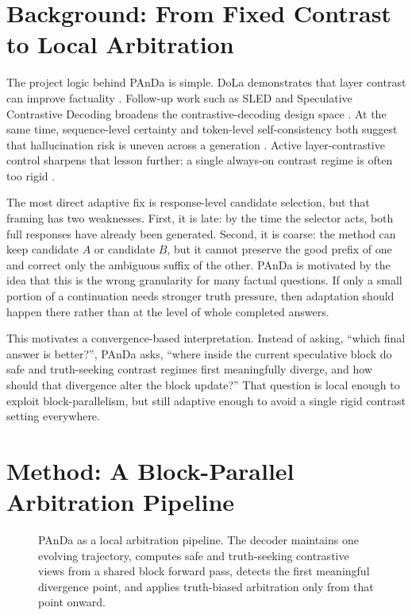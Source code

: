 \documentclass[10pt,twocolumn]{article}
\begin{document}
\section{Background: From Fixed Contrast to Local Arbitration}
The project logic behind PAnDa is simple. DoLa demonstrates that layer contrast can improve factuality \citep{chuang2023dola}. Follow-up work such as SLED and Speculative Contrastive Decoding broadens the contrastive-decoding design space \citep{zhang2024sled,yuan2023scd}. At the same time, sequence-level certainty and token-level self-consistency both suggest that hallucination risk is uneven across a generation \citep{wan2023sequence,wastl2025token}. Active layer-contrastive control sharpens that lesson further: a single always-on contrast regime is often too rigid \citep{zhang2025actlcd}.

The most direct adaptive fix is response-level candidate selection, but that framing has two weaknesses. First, it is late: by the time the selector acts, both full responses have already been generated. Second, it is coarse: the method can keep candidate \(A\) or candidate \(B\), but it cannot preserve the good prefix of one and correct only the ambiguous suffix of the other. PAnDa is motivated by the idea that this is the wrong granularity for many factual questions. If only a small portion of a continuation needs stronger truth pressure, then adaptation should happen there rather than at the level of whole completed answers.

This motivates a convergence-based interpretation. Instead of asking, ``which final answer is better?'', PAnDa asks, ``where inside the current speculative block do safe and truth-seeking contrast regimes first meaningfully diverge, and how should that divergence alter the block update?'' That question is local enough to exploit block-parallelism, but still adaptive enough to avoid a single rigid contrast setting everywhere.

\section{Method: A Block-Parallel Arbitration Pipeline}
\begin{figure}[t]
\centering
{}
\caption{PAnDa as a local arbitration pipeline. The decoder maintains one evolving trajectory, computes safe and truth-seeking contrastive views from a shared block forward pass, detects the first meaningful divergence point, and applies truth-biased arbitration only from that point onward.}
\label{fig:panda-pipeline}
\end{figure}
\end{document}
